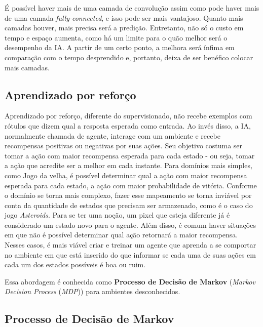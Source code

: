 É possível haver mais de uma camada de convolução assim como pode haver mais de uma camada \textit{fully-connected}, e isso pode ser mais vantajoso. Quanto mais camadas houver, mais precisa será a predição. Entretanto, não só o custo em tempo e espaço aumenta, como há um limite para o quão melhor será o desempenho da IA. A partir de um certo ponto, a melhora será ínfima em comparação com o tempo desprendido e, portanto, deixa de ser benéfico colocar mais camadas.

\subsection{Aprendizado por reforço}
\label{sec:rl}

Aprendizado por reforço, diferente do supervisionado, não recebe exemplos com rótulos que dizem qual a resposta esperada como entrada. Ao invés disso, a IA, normalmente chamada de agente, interage com um ambiente e recebe recompensas positivas ou negativas por suas ações. Seu objetivo costuma ser tomar a ação com maior recompensa esperada para cada estado - ou seja, tomar a ação que acredite ser a melhor em cada instante.
Para domínios mais simples, como Jogo da velha, é possível determinar qual a ação com maior recompensa esperada para cada estado, a ação com maior probabilidade de vitória.
Conforme o domínio se torna mais complexo, fazer esse mapeamento se torna inviável por conta da quantidade de estados que precisam ser armazenado, como é o caso do jogo \textit{Asteroids}. Para se ter uma noção, um pixel que esteja diferente já é considerado um estado novo para o agente. Além disso, é comum haver situações em que não é possível determinar qual ação retornará a maior recompensa.
Nesses casos, é mais viável criar e treinar um agente que aprenda a se comportar no ambiente em que está inserido do que informar se cada uma de suas ações em cada um dos estados possíveis é boa ou ruim.

Essa abordagem é conhecida como \textbf{Processo de Decisão de Markov} (\textit{Markov Decision Process} (\textit{MDP})) para ambientes desconhecidos.

\subsection{Processo de Decisão de Markov}
\label{sec:mdp}

